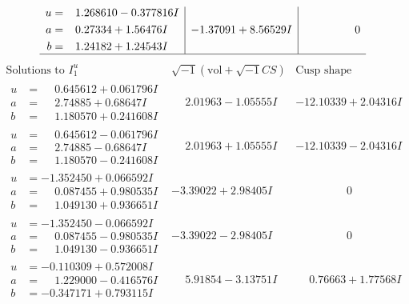 \documentclass[1p]{elsarticle_modified}
\theoremstyle{definition}
\newcommand{\I}{\sqrt{-1}}
\begin{document}
$$\begin{array}{c|c|c}
\begin{aligned}
u &= \phantom{-}1.268610 - 0.377816 I \\
a &= \phantom{-}0.27334 + 1.56476 I \\
b &= \phantom{-}1.24182 + 1.24543 I\end{aligned}
 & -1.37091 + 8.56529 I & \phantom{-0.000000 } 0\\
 \hline 
 \end{array}$$\newpage$$\begin{array}{c|c|c}  
\text{Solutions to }I^u_{1}& \I (\text{vol} + \sqrt{-1}CS) & \text{Cusp shape}\\
 \hline 
\begin{aligned}
u &= \phantom{-}0.645612 + 0.061796 I \\
a &= \phantom{-}2.74885 + 0.68647 I \\
b &= \phantom{-}1.180570 + 0.241608 I\end{aligned}
 & \phantom{-}2.01963 - 1.05555 I & -12.10339 + 2.04316 I \\ \hline\begin{aligned}
u &= \phantom{-}0.645612 - 0.061796 I \\
a &= \phantom{-}2.74885 - 0.68647 I \\
b &= \phantom{-}1.180570 - 0.241608 I\end{aligned}
 & \phantom{-}2.01963 + 1.05555 I & -12.10339 - 2.04316 I \\ \hline\begin{aligned}
u &= -1.352450 + 0.066592 I \\
a &= \phantom{-}0.087455 + 0.980535 I \\
b &= \phantom{-}1.049130 + 0.936651 I\end{aligned}
 & -3.39022 + 2.98405 I & \phantom{-0.000000 } 0 \\ \hline\begin{aligned}
u &= -1.352450 - 0.066592 I \\
a &= \phantom{-}0.087455 - 0.980535 I \\
b &= \phantom{-}1.049130 - 0.936651 I\end{aligned}
 & -3.39022 - 2.98405 I & \phantom{-0.000000 } 0 \\ \hline\begin{aligned}
u &= -0.110309 + 0.572008 I \\
a &= \phantom{-}1.229000 - 0.416576 I \\
b &= -0.347171 + 0.793115 I\end{aligned}
 & \phantom{-}5.91854 - 3.13751 I & \phantom{-}0.76663 + 1.77568 I \\ \hline\begin{aligned}

\end{aligned}
\end{array}$$
\end{document}
